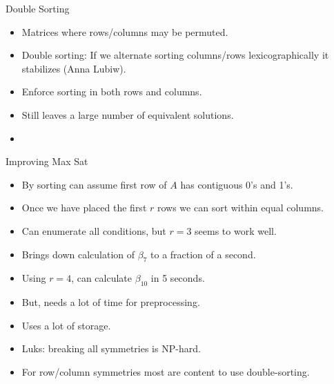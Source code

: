 \begin{frame}{Double Sorting}
  \begin{itemize}
  \item Matrices where rows/columns may be permuted.
  \item Double sorting: If we alternate sorting columns/rows
    lexicographically it stabilizes (Anna Lubiw).
  \item Enforce sorting in both rows and columns.
  \item Still leaves a large number of equivalent solutions.
  \item 
  \end{itemize}
  
\end{frame}
\begin{frame}{Improving Max Sat}
  \begin{itemize}
  \item By sorting can assume first row of $A$ has contiguous 0's and
    1's.
  \item Once we have placed the first $r$ rows we can sort within
    equal columns.
  \item Can enumerate all conditions, but $r=3$ seems to work well.
  \item Brings down calculation of $\beta_7$ to a fraction of a
    second.
  \item Using $r=4$, can calculate $\beta_{10}$ in 5 seconds.
  \item But, needs a lot of time for preprocessing.
  \item Uses a lot of storage.
  \item Luks: breaking all symmetries is NP-hard.
  \item For row/column symmetries most are content to use
    double-sorting.
  \end{itemize}
\end{frame}

